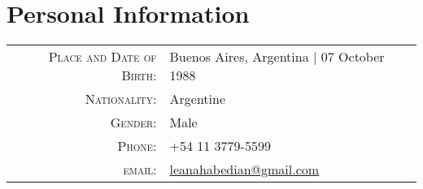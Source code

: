 \section{Personal Information}

\begin{tabular}{rl}
    \textsc{Place and Date of Birth:} & Buenos Aires, Argentina  | 07 October 1988 \\
    \textsc{Nationality:}   & Argentine \\
    \textsc{Gender:}        & Male \\
    \textsc{Phone:}         & +54 11 3779-5599\\
    \textsc{email:}         & \href{mailto:leanahabedian@gmail.com}{leanahabedian@gmail.com}
\end{tabular}

